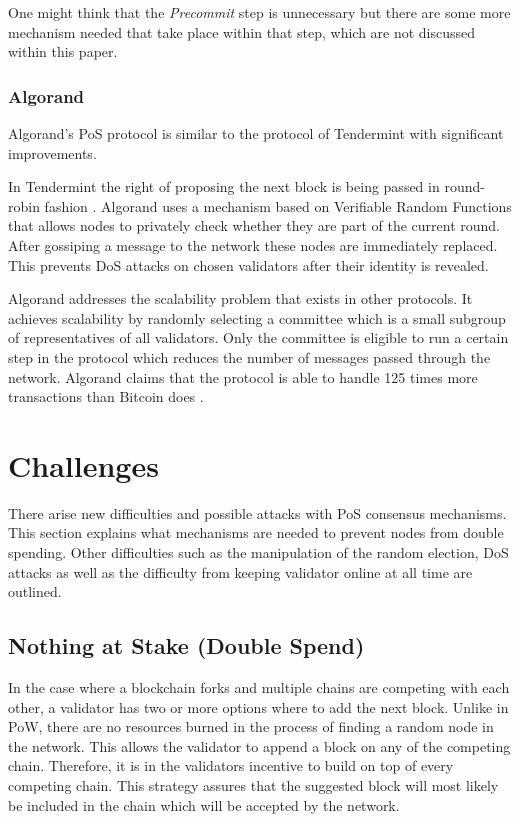 One might think that the \textit{Precommit} step is unnecessary but there are some more mechanism needed \cite{tendermit_docs} that take place within that step, which are not discussed within this paper. 


\subsubsection{Algorand}
Algorand's PoS protocol is similar to the protocol of Tendermint with significant improvements. 

In Tendermint the right of proposing the next block is being passed in round-robin fashion \cite{tendermit_paper}. Algorand uses a mechanism based on Verifiable Random Functions that allows nodes to privately check whether they are part of the current round. After gossiping a message to the network these nodes are immediately replaced. This prevents DoS attacks on chosen validators after their identity is revealed. 

Algorand addresses the scalability problem that exists in other protocols. It achieves scalability by randomly selecting a committee which is a small subgroup of representatives of all validators. Only the committee is eligible to run a certain step in the protocol which reduces the number of messages passed through the network. Algorand claims that the protocol is able to handle 125 times more transactions than Bitcoin does \cite{algorand_paper}. 



\section{Challenges}
There arise new difficulties and possible attacks with PoS consensus mechanisms. This section explains what mechanisms are needed to prevent nodes from double spending. Other difficulties such as the manipulation of the random election, DoS attacks as well as the difficulty from keeping validator online at all time are outlined.

\subsection{Nothing at Stake (Double Spend)}\label{nothing-at-stake}

In the case where a blockchain forks and multiple chains are competing with each other, a validator has two or more options where to add the next block. Unlike in PoW, there are no resources burned in the process of finding a random node in the network. This allows the validator to append a block on any of the competing chain. Therefore, it is in the validators incentive to build on top of every competing chain. This strategy assures that the suggested block will most likely be included in the chain which will be accepted by the network. 

